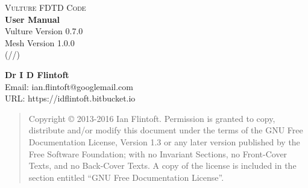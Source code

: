 \documentclass[onecolumn,a4paper]{article}
\numberwithin{equation}{section}
\begin{document}
%
%
\thispagestyle{empty}
\begin{flushright}
\vspace{5mm}
\begin{minipage}[t]{\linewidth}
\begin{center}
\end{center}
\end{minipage}  
\end{flushright}

\vspace{80mm}
\hspace{45mm}\begin{minipage}[t]{60mm}
\large
\begin{center}
  {\scshape Vulture FDTD Code}\\
  \vspace{4mm} 
  {\bf User Manual} \\
  \vspace{4mm} Vulture Version 0.7.0\\
               Mesh Version 1.0.0\\
               (\number\day/\number\month/\number\year)
\end{center}
\normalsize
\end{minipage}  

\vspace{20mm}
\begin{minipage}[t][100mm][b]{70mm}
{\large\bf Dr I D Flintoft}\\
Email: ian.flintoft@googlemail.com\\
URL: https://idflintoft.bitbucket.io
\end{minipage}  
\hfill
\newpage
\thispagestyle{empty}
%
%
%
%

\bigskip
\begin{quote}
    Copyright \copyright{}  2013-2016 Ian Flintoft.
    Permission is granted to copy, distribute and/or modify this document
    under the terms of the GNU Free Documentation License, Version 1.3
    or any later version published by the Free Software Foundation;
    with no Invariant Sections, no Front-Cover Texts, and no Back-Cover Texts.
    A copy of the license is included in the section entitled ``GNU
    Free Documentation License''.
\end{quote}
\bigskip
\end{document}
